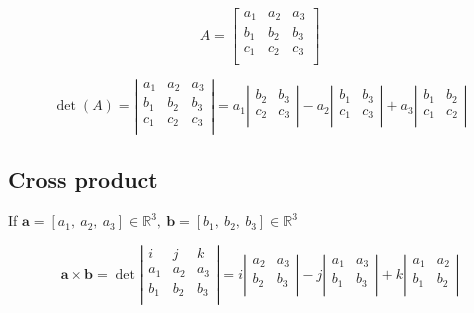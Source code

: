 \documentclass[
]{article}
\begin{document}
$$A = \begin{bmatrix}
a_{1} & a_{2} & a_{3} \\
b_{1} & b_{2} & b_{3} \\
c_{1} & c_{2} & c_{3} \\
\end{bmatrix}$$

$$\det(A) = \left| \begin{matrix}
a_{1} & a_{2} & a_{3} \\
b_{1} & b_{2} & b_{3} \\
c_{1} & c_{2} & c_{3} \\
\end{matrix} \right| = a_{1}\left| \begin{matrix}
b_{2} & b_{3} \\
c_{2} & c_{3} \\
\end{matrix} \right| - a_{2}\left| \begin{matrix}
b_{1} & b_{3} \\
c_{1} & c_{3} \\
\end{matrix} \right| + a_{3}\left| \begin{matrix}
b_{1} & b_{2} \\
c_{1} & c_{2} \\
\end{matrix} \right|$$


\subsection{Cross product}

If
$\mathbf{a} = \left\lbrack a_{1},\ a_{2},\ a_{3} \right\rbrack \in \mathbb{R}^{3},\ \mathbf{b} = \left\lbrack b_{1},\ b_{2},\ b_{3} \right\rbrack \in \mathbb{R}^{3}$

$$\mathbf{a} \times \mathbf{b} = \det\left| \begin{matrix}
i & j & k \\
a_{1} & a_{2} & a_{3} \\
b_{1} & b_{2} & b_{3} \\
\end{matrix} \right| = i\left| \begin{matrix}
a_{2} & a_{3} \\
b_{2} & b_{3} \\
\end{matrix} \right| - j\left| \begin{matrix}
a_{1} & a_{3} \\
b_{1} & b_{3} \\
\end{matrix} \right| + k\left| \begin{matrix}
a_{1} & a_{2} \\
b_{1} & b_{2} \\
\end{matrix} \right|$$
\end{document}
